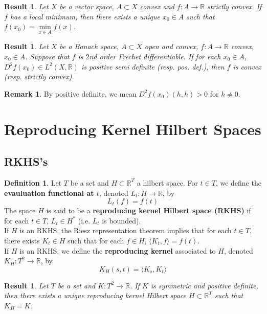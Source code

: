 \documentclass[twoside]{article}
\newtheorem{res}[thm]{Result}
\theoremstyle{definition}
\newtheorem{defn}[definition]{Definition}
\theoremstyle{definition}
\newtheorem{rem}[definition]{Remark}
\newcommand{\R}{\mathbb{R}}
\renewcommand{\r}{\rangle}
\renewcommand{\l}{\langle}
\begin{document}
\begin{res}
Let $X$ be a vector space, $A \subset X$ convex and $f:A \rightarrow \R$ strictly convex. If $f$ has a local minimum, then there exists a unique $x_0 \in A$ such that $f(x_0) = \min\limits_{x \in A}f(x)$.
\end{res}

\begin{res}
Let $X$ be a Banach space, $A \subset X$ open and convex, $f:A \rightarrow \R$ convex, $x_0 \in A$. Suppose that $f$ is $2$nd order Frechet differentiable. If for each $x_0 \in A$, $D^2f(x_0) \in L^2(X, \R)$ is positive semi definite (resp. pos. def.), then $f$ is convex (resp. strictly convex). 
\end{res}

\begin{rem}
By positive definite, we mean $D^2f(x_0)(h,h) > 0$ for $h \neq 0$.
\end{rem}

\section{Reproducing Kernel Hilbert Spaces}
\subsection{RKHS's}

\begin{defn}
Let $T$ be a set and $H \subset \R^T$ a hilbert space. For $t \in T$, we define the \textbf{evauluation functional at $t$}, denoted $L_t : H \rightarrow \R$, by $$L_t(f) = f(t)$$ 
The space $H$ is said to be a \textbf{reproducing kernel Hilbert space (RKHS)} if for each $t \in T$, $L_t \in H^*$ (i.e. $L_t$ is bounded). \\
If $H$ is an RKHS, the Riesz representation theorem implies that for each $t \in T$, there exists $K_t \in H$ such that for each $f \in H$, $\l K_t, f\r = f(t)$.\\
If $H$ is an RKHS, we define the \textbf{reproducing kernel} associated to $H$, denoted $K_H:T^2 \rightarrow \R$, by $$K_H(s,t) = \l K_s, K_t \r$$ 
\end{defn}

\begin{res}
Let $T$ be a set and $K : T^2 \rightarrow \R$. If $K$ is symmetric and positive definite, then there exists a unique reproducing kernel Hilbert space $H \subset \R^T$ such that $K_H = K$.
\end{res}
\end{document}
